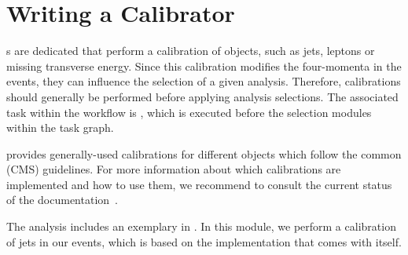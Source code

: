 \section{Writing a Calibrator}\label{sec:calibrator}

s are dedicated  that perform a calibration of objects, such as jets, leptons or missing transverse energy.
Since this calibration modifies the four-momenta in the events, they can influence the selection of a given analysis.
Therefore, calibrations should generally be performed before applying analysis selections.
The associated task within the workflow is , which is executed before the selection modules within the task graph.

\columnflow provides generally-used calibrations for different objects which follow the common (CMS) guidelines.
For more information about which calibrations are implemented and how to use them, we recommend to consult the current status of the documentation~\cite{cf_repo}.

The  analysis includes an exemplary  in .
In this module, we perform a calibration of jets in our events, which is based on the implementation that comes with \columnflow itself.

%
%
%
%
%
%
%
%
%
%
%
%
%

